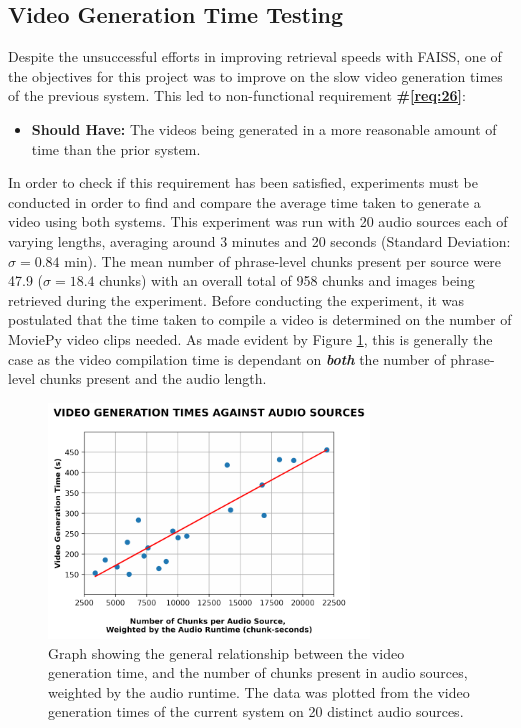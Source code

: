 \documentclass{l4proj}
\begin{document}
\subsection{Video Generation Time Testing}
Despite the unsuccessful efforts in improving retrieval speeds with FAISS, one of the objectives for this project was to improve on the slow video generation times of the previous system. This led to non-functional requirement \textbf{\#\ref{req:26}}:

\begin{itemize}
    \item \textbf{Should Have:} The videos being generated in a more reasonable amount of time than the prior system.
\end{itemize}

In order to check if this requirement has been satisfied, experiments must be conducted in order to find and compare the average time taken to generate a video using both systems. This experiment was run with 20 audio sources each of varying lengths, averaging around 3 minutes and 20 seconds (Standard Deviation: $\sigma = 0.84$ min). The mean number of phrase-level chunks present per source were 47.9 ($\sigma = 18.4$ chunks) with an overall total of 958 chunks and images being retrieved during the experiment. Before conducting the experiment, it was postulated that the time taken to compile a video is determined on the number of MoviePy video clips needed. As made evident by Figure \ref{fig:videography_against_wchunks}, this is generally the case as the video compilation time is dependant on \textbf{\emph{both}} the number of phrase-level chunks present and the audio length.

\begin{figure}[H]
    \centering
    \includegraphics[width=0.76\textwidth]{figures/video_generation_against_wchunks.pdf}
    \caption{Graph showing the general relationship between the video generation time, and the number of chunks present in audio sources, weighted by the audio runtime. The data was plotted from the video generation times of the current system on 20 distinct audio sources.}
    \label{fig:videography_against_wchunks}
\end{figure}
\end{document}
